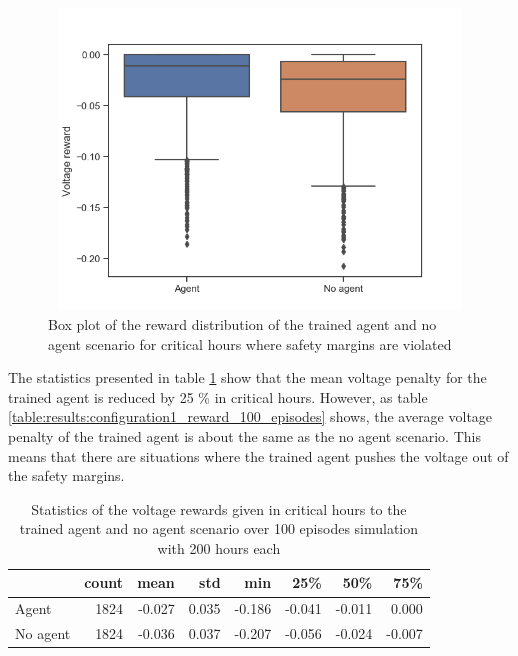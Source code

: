 \documentclass[class=book, crop=false]{standalone}
\begin{document}
\begin{figure}[H]
    \center
\includegraphics[height=8cm, width=12cm]{figures/config1_voltage_boxplot.png}
    \caption[size = 9]{Box plot of the reward distribution of the trained agent and no agent scenario for critical hours where safety margins are violated}
    \label{fig:results:config1_voltage_boxplot}
\end{figure}

The statistics presented in table \ref{table:results:configuration1_reward_100_ep_preventive} show that the mean voltage penalty for the trained agent is reduced by 25 \% in critical hours. However, as table
\ref{table:results:configuration1_reward_100_episodes} shows, the average voltage penalty of the trained agent is about the same as the no agent scenario. This means that there are situations where the trained agent pushes the voltage out of the safety margins.    


\begin{table}[h]
\center
\begin{tabular}{l|rrrrrrr}
         & count & mean   & std   & min    & 25\%   & 50\%   & 75\%   \\
\hline
Agent    & 1824 & -0.027 & 0.035 & -0.186 & -0.041 & -0.011 & 0.000  \\
No agent & 1824 & -0.036 & 0.037 & -0.207 & -0.056 & -0.024 & -0.007 \\
\hline
\end{tabular}
\caption{Statistics of the voltage rewards given in critical hours to the trained agent and no agent scenario over 100 episodes simulation with 200 hours each}
\label{table:results:configuration1_reward_100_ep_preventive}
\end{table}
\end{document}
